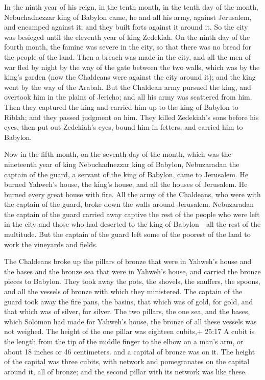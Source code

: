  In the ninth year of his reign, in the tenth month, in the
tenth day of the month, Nebuchadnezzar king of Babylon came, he and all
his army, against Jerusalem, and encamped against it; and they built
forts against it around it.  So the city was besieged until
the eleventh year of king Zedekiah.  On the ninth day of the
fourth month, the famine was severe in the city, so that there was no
bread for the people of the land.  Then a breach was made in
the city, and all the men of war fled by night by the way of the gate
between the two walls, which was by the king's garden (now the Chaldeans
were against the city around it); and the king went by the way of the
Arabah.  But the Chaldean army pursued the king, and
overtook him in the plains of Jericho; and all his army was scattered
from him.  Then they captured the king and carried him up to
the king of Babylon to Riblah; and they passed judgment on him.
 They killed Zedekiah's sons before his eyes, then put out
Zedekiah's eyes, bound him in fetters, and carried him to Babylon.

 Now in the fifth month, on the seventh day of the month,
which was the nineteenth year of king Nebuchadnezzar king of Babylon,
Nebuzaradan the captain of the guard, a servant of the king of Babylon,
came to Jerusalem.  He burned Yahweh's house, the king's
house, and all the houses of Jerusalem. He burned every great house with
fire.  All the army of the Chaldeans, who were with the
captain of the guard, broke down the walls around Jerusalem.
 Nebuzaradan the captain of the guard carried away captive
the rest of the people who were left in the city and those who had
deserted to the king of Babylon---all the rest of the multitude.
 But the captain of the guard left some of the poorest of
the land to work the vineyards and fields.

 The Chaldeans broke up the pillars of bronze that were in
Yahweh's house and the bases and the bronze sea that were in Yahweh's
house, and carried the bronze pieces to Babylon.  They took
away the pots, the shovels, the snuffers, the spoons, and all the
vessels of bronze with which they ministered.  The captain
of the guard took away the fire pans, the basins, that which was of
gold, for gold, and that which was of silver, for silver. 
The two pillars, the one sea, and the bases, which Solomon had made for
Yahweh's house, the bronze of all these vessels was not weighed.
 The height of the one pillar was eighteen cubits,+ 25:17 A
cubit is the length from the tip of the middle finger to the elbow on a
man's arm, or about 18 inches or 46 centimeters. and a capital of bronze
was on it. The height of the capital was three cubits, with network and
pomegranates on the capital around it, all of bronze; and the second
pillar with its network was like these.

